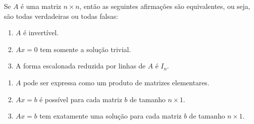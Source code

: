 \documentclass{beamer}
\begin{document}
    \begin{frame}
        \begin{teorema}
            Se $A$ é uma matriz $n \times n$, então as seguintes afirmações são equivalentes, ou seja, são todas verdadeiras ou todas falsas:
            \begin{enumerate}[label={\roman*})]
                \item $A$ é invertível.
                
                \vspace{1cm}

                \item $Ax = 0$ tem somente a solução trivial.
                 
                \vspace{1cm}

                \item A forma escalonada reduzida por linhas de $A$ é $I_n$.
                 
                \seti
            \end{enumerate}
        \end{teorema}
    \end{frame}

    \begin{frame}
        \begin{teorema}
            \begin{enumerate}[label={\roman*})]
                \conti

                \item $A$ pode ser expressa como um produto de matrizes elementares.
                 
                \vspace{1cm}

                \item $Ax = b$ é possível para cada matriz $b$ de tamanho $n \times 1$.
                 
                \vspace{1cm}

                \item $Ax = b$ tem exatamente uma solução para cada matriz $b$ de tamanho $n \times 1$.
            \end{enumerate}
        \end{teorema}
    \end{frame}
\end{document}
